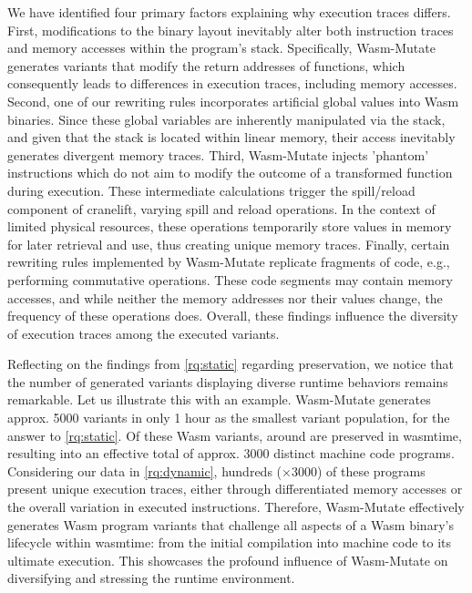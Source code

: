 \documentclass[sigplan,screen]{acmart}
\newcommand*\badge[1]{ \colorbox{red}{\color{white}#1}}
\newcommand{\tool}{{\sc Wasm-Mutate}\xspace}
\newcommand{\wasm}{Wasm\xspace}
\newcommand{\todo}[1]{%
\refstepcounter{todo}
\noindent\textbf{\badge{TODO}} {\color{red}#1}
\addcontentsline{td}{todo}
{\color{red}\thesection.\thetodo\xspace #1}}
\begin{document}
We have identified four primary factors explaining why execution traces differs.
First, modifications to the binary layout inevitably alter both instruction traces and memory accesses within the program's stack. 
Specifically, \tool generates variants that modify the return addresses of functions, which consequently leads to differences in execution traces, including memory accesses.
Second, one of our rewriting rules incorporates artificial global values into \wasm binaries. 
Since these global variables are inherently manipulated via the stack, and given that the stack is located within linear memory, their access inevitably generates divergent memory traces.
Third, \tool injects 'phantom' instructions which do not aim to modify the outcome of a transformed function during execution. 
These intermediate calculations trigger the spill/reload component of cranelift, varying spill and reload operations. 
In the context of limited physical resources, these operations temporarily store values in memory for later retrieval and use, thus creating unique memory traces.
Finally, certain rewriting rules implemented by \tool replicate fragments of code, e.g., performing commutative operations. 
These code segments may contain memory accesses, and while neither the memory addresses nor their values change, the frequency of these operations does.
Overall, these findings influence the diversity of execution traces among the executed variants. 




Reflecting on the findings from \ref{rq:static} regarding preservation, we notice that the number of generated variants displaying diverse runtime behaviors remains remarkable. 
Let us illustrate this with an example.
\tool generates approx. 5000 variants in only 1 hour as the smallest variant population, for the answer to \ref{rq:static}. 
Of these \wasm variants, around \preserved are preserved in wasmtime, resulting into an effective total of approx. 3000 distinct machine code programs.
Considering our data in \ref{rq:dynamic}, hundreds (\memratio$\times$3000) of these programs present unique execution traces, either through differentiated memory accesses or the overall variation in executed instructions. 
Therefore, \tool effectively generates \wasm program variants that challenge all aspects of a \wasm binary's lifecycle within wasmtime: from the initial compilation into machine code to its ultimate execution. 
This showcases the profound influence of \tool on diversifying and stressing the runtime environment.
\end{document}
